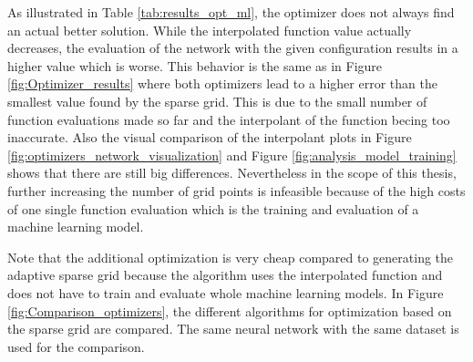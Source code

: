 As illustrated in Table \ref{tab:results_opt_ml}, the optimizer does not always find an actual better solution. While the interpolated function value actually decreases, the evaluation of the network with the given configuration results in a higher value which is worse. This behavior is the same as in Figure \ref{fig:Optimizer_results} where both optimizers lead to a higher error than the smallest value found by the sparse grid. This is due to the small number of function evaluations made so far and the interpolant of the function becing too inaccurate. Also the visual comparison of the interpolant plots in Figure \ref{fig:optimizers_network_visualization} and Figure \ref{fig:analysis_model_training} shows that there are still big differences. Nevertheless in the scope of this thesis, further increasing the number of grid points is infeasible because of the high costs of one single function evaluation which is the training and evaluation of a machine learning model. \newline

Note that the additional optimization is very cheap compared to generating the adaptive sparse grid because the algorithm uses the interpolated function and does not have to train and evaluate whole machine learning models. In Figure \ref{fig:Comparison_optimizers}, the different algorithms for optimization based on the sparse grid are compared. The same neural network with the same dataset is used for the comparison.


